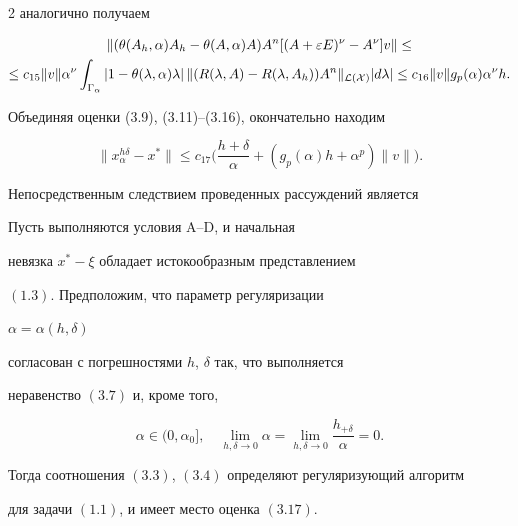 2 аналогично получаем 


\begin{multline} 


\|(\theta(A_h,\alpha)A_h-\theta(A,\alpha)A)A^n 


[(A+\varepsilon E)^\nu-A^\nu]v\|\le \\ 


% 


\le c_{15}\|v\|\alpha^\nu\int_{\Gamma_\alpha} 


|1-\theta(\lambda,\alpha)\lambda|\,\|(R(\lambda,A)- 


R(\lambda,A_h))A^n\|_{\cal L(X)}|d\lambda|\le 


c_{16}\|v\|g_p(\alpha)\alpha^\nu h. 


\end{multline} 


Объединяя оценки (3.9), (3.11)--(3.16), окончательно находим 


\begin{equation} 


\|x^{h\delta}_\alpha-x^*\|\le c_{17} 


\bigg(\frac{h+\delta}{\alpha}+(g_p(\alpha)h+\alpha^p) 


\|v\|\bigg). 


\end{equation} 


 


Непосредственным следствием проведенных рассуждений является 


 


\begin{thm} 


Пусть выполняются условия $\mathrm A$--$\mathrm D$, и начальная 


невязка $x^*-\xi$ обладает истокообразным представлением 


$(1.3)$. Предположим, что параметр регуляризации 


$\alpha=\alpha(h,\delta)$ 


согласован с погрешностями $h$, $\delta$ так, что выполняется 


неравенство $(3.7)$ и, кроме того, 


\begin{equation} 


\alpha\in(0,\alpha_0],\quad 


\lim_{h,\delta\to0}\alpha=\lim_{h,\delta\to0} 


\frac{h_{+\delta}}{\alpha}=0. 


\end{equation} 


Тогда соотношения $(3.3)$, $(3.4)$ определяют регуляризующий алгоритм 


для задачи $(1.1)$, и имеет место оценка $(3.17)$. 


\end{thm} 


